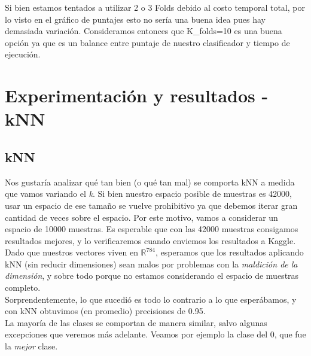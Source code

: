 Si bien estamos tentados a utilizar 2 o 3 Folds debido al costo temporal total, por lo visto en el gráfico de puntajes esto no sería una buena idea pues hay demasiada variación. Consideramos entonces que K_folds=10 es una buena opción ya que es un balance entre puntaje de nuestro clasificador y tiempo de ejecución.


\newpage
\section{Experimentación y resultados - kNN}

\subsection{kNN}


Nos gustaría analizar qué tan bien (o qué tan mal) se comporta kNN a medida que vamos variando el \textit{k}. Si bien nuestro espacio posible de muestras es 42000, usar un espacio de ese tamaño se vuelve prohibitivo ya que debemos iterar gran cantidad de veces sobre el espacio. Por este motivo, vamos a considerar un espacio de 10000 muestras. Es esperable que con las 42000 muestras consigamos resultados mejores, y lo verificaremos cuando enviemos los resultados a Kaggle. \\

Dado que nuestros vectores viven en $\mathbb{R}^{784}$, esperamos que los resultados aplicando kNN (sin reducir dimensiones) sean malos por problemas con la \textit{maldición de la dimensión}, y sobre todo porque no estamos considerando el espacio de muestras completo. \\

Sorprendentemente, lo que sucedió es todo lo contrario a lo que esperábamos, y con kNN obtuvimos (en promedio) precisiones de 0.95. \\

La mayoría de las clases se comportan de manera similar, salvo algunas excepciones que veremos más adelante. Veamos por ejemplo la clase del 0, que fue la \textit{mejor} clase.

